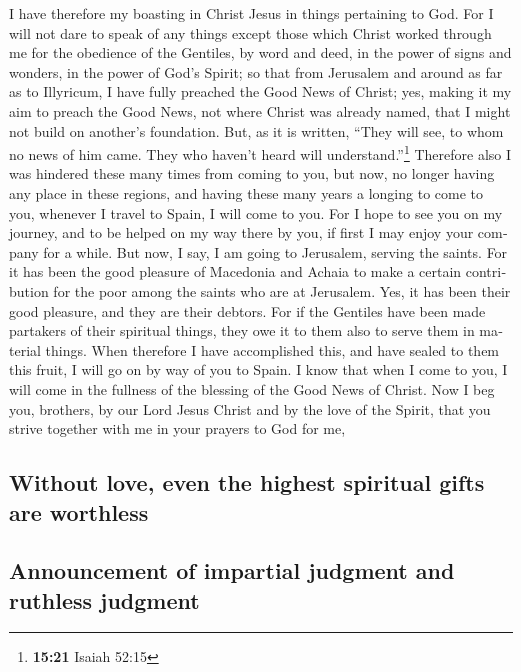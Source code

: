 \begin{paracol}{2}
\begin{otherlanguage}{english}
I have therefore my boasting in Christ Jesus in things pertaining to
God.  For I will not dare to speak of any things except
those which Christ worked through me for the obedience of the Gentiles,
by word and deed,  in the power of signs and wonders, in
the power of God's Spirit; so that from Jerusalem and around as far as
to Illyricum, I have fully preached the Good News of Christ;
 yes, making it my aim to preach the Good News, not where
Christ was already named, that I might not build on another's
foundation.  But, as it is written, ``They will see, to
whom no news of him came. They who haven't heard will
understand.''\footnote{\textbf{15:21} Isaiah 52:15} 
Therefore also I was hindered these many times from coming to you,
 but now, no longer having any place in these regions,
and having these many years a longing to come to you, 
whenever I travel to Spain, I will come to you. For I hope to see you on
my journey, and to be helped on my way there by you, if first I may
enjoy your company for a while.  But now, I say, I am
going to Jerusalem, serving the saints.  For it has been
the good pleasure of Macedonia and Achaia to make a certain contribution
for the poor among the saints who are at Jerusalem.  Yes,
it has been their good pleasure, and they are their debtors. For if the
Gentiles have been made partakers of their spiritual things, they owe it
to them also to serve them in material things.  When
therefore I have accomplished this, and have sealed to them this fruit,
I will go on by way of you to Spain.  I know that when I
come to you, I will come in the fullness of the blessing of the Good
News of Christ.  Now I beg you, brothers, by our Lord
Jesus Christ and by the love of the Spirit, that you strive together
with me in your prayers to God for me,

\hypertarget{without-love-even-the-highest-spiritual-gifts-are-worthless}{%
\subsection{Without love, even the highest spiritual gifts are
worthless}\label{without-love-even-the-highest-spiritual-gifts-are-worthless}}

\hypertarget{announcement-of-impartial-judgment-and-ruthless-judgment}{%
\subsection{Announcement of impartial judgment and ruthless
judgment}\label{announcement-of-impartial-judgment-and-ruthless-judgment}}


\end{otherlanguage}
\end{paracol}
